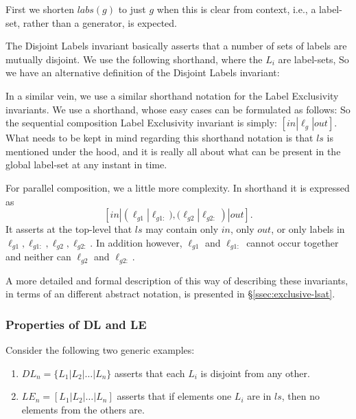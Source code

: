 First we shorten $labs(g)$ to just $g$ when this is clear from context,
i.e., a label-set, rather than a generator, is expected.

The Disjoint Labels invariant basically asserts
that a number of sets of labels are mutually disjoint.
We use the following shorthand, where the $L_i$ are label-sets,
So we have an alternative definition of the Disjoint Labels invariant:

In a similar vein, we use a similar shorthand notation
for the Label Exclusivity invariants.
We use a shorthand,
whose easy cases can be formulated as follows:
So the sequential composition Label Exclusivity invariant
is simply: $[in|\ell_g|out]$.
What needs to be kept in mind regarding this shorthand notation
is that $ls$ is mentioned under the hood,
and it is really all about what can be present in the global label-set
at any instant in time.

For parallel composition, we a little more complexity.
In shorthand it is expressed as
\[
   [in|(\ell_{g1}|\ell_{g1:}),(\ell_{g2}|\ell_{g2:})|out].
\]
It asserts at the top-level that $ls$
may contain only $in$, only $out$,
or only labels in $\ell_{g1},\ell_{g1:},\ell_{g2},\ell_{g2:}$.
In addition however, $\ell_{g1}$ and $\ell_{g1:}$ cannot occur together
and neither can $\ell_{g2}$ and $\ell_{g2:}$.

A more detailed and formal description of this way of describing
these invariants, in terms of an different abstract notation,
is presented in \S\ref{ssec:exclusive-lsat}.

\subsubsection{Properties of DL and LE}

Consider the following two generic examples:
\begin{enumerate}
  \item
    $DL_n = \{L_1|L_2|\dots|L_n\}$
    asserts that each $L_i$ is disjoint from any other.
  \item
    $LE_n = [L_1|L_2|\dots|L_n]$
    asserts that if elements one $L_i$ are in $ls$,
    then no elements from the others are.
\end{enumerate}

